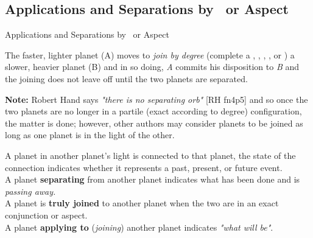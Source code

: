\subsection{Applications and Separations by \Conjunction\ or Aspect}

\begin{frame}[t]{Applications and Separations by \Conjunction\ or Aspect}
\begin{block}{}
The faster, lighter planet (A) moves to \textsl{join by degree} (complete a \Conjunction, \Sextile, \Square, \Trine, or \Opposition) a slower, heavier planet (B) and in so doing, \textsl{A} commits his disposition to \textsl{B} and the joining does not leave off until the two planets are separated.
\end{block}

\begin{mdframed}[backgroundcolor=gray!5, rightmargin=2em, leftmargin=2em]
\small
\textbf{Note:} Robert Hand says \textsl{"there is no separating orb"} [RH fn4p5] and so once the two planets are no longer in a partile (exact according to degree) configuration, the matter is done; however, other authors may consider planets to be joined as long as one planet is in the light of the other.\footnotemark[1]
\end{mdframed}

A planet in another planet's light is connected to that planet, the state of the connection indicates whether it represents a past, present, or future event.\\

A planet \textbf{separating} from another planet indicates what has been done and is \textsl{passing away.}\\

A planet is \textbf{truly joined} to another planet when the two are in an exact conjunction or aspect.\\

A planet \textbf{applying to} (\textsl{joining}) another planet  indicates \textsl{"what will be"}. \\


\end{frame}